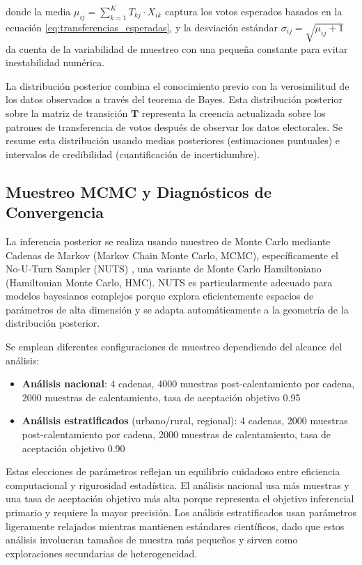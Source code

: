 donde la media $\mu_{ij} = \sum_{k=1}^{K} T_{kj} \cdot X_{ik}$ captura los votos esperados basados en la ecuación \ref{eq:transferencias_esperadas}, y la desviación estándar $\sigma_{ij} = \sqrt{\mu_{ij} + 1}$ da cuenta de la variabilidad de muestreo con una pequeña constante para evitar inestabilidad numérica.

La distribución posterior combina el conocimiento previo con la verosimilitud de los datos observados a través del teorema de Bayes. Esta distribución posterior sobre la matriz de transición $\mathbf{T}$ representa la creencia actualizada sobre los patrones de transferencia de votos después de observar los datos electorales. Se resume esta distribución usando medias posteriores (estimaciones puntuales) e intervalos de credibilidad (cuantificación de incertidumbre).

\subsection{Muestreo MCMC y Diagnósticos de Convergencia}

La inferencia posterior se realiza usando muestreo de Monte Carlo mediante Cadenas de Markov (Markov Chain Monte Carlo, MCMC), específicamente el No-U-Turn Sampler (NUTS) \cite{betancourt2017conceptual}, una variante de Monte Carlo Hamiltoniano (Hamiltonian Monte Carlo, HMC). NUTS es particularmente adecuado para modelos bayesianos complejos porque explora eficientemente espacios de parámetros de alta dimensión y se adapta automáticamente a la geometría de la distribución posterior.

Se emplean diferentes configuraciones de muestreo dependiendo del alcance del análisis:

\begin{itemize}
    \item \textbf{Análisis nacional}: 4 cadenas, 4000 muestras post-calentamiento por cadena, 2000 muestras de calentamiento, tasa de aceptación objetivo 0.95
    \item \textbf{Análisis estratificados} (urbano/rural, regional): 4 cadenas, 2000 muestras post-calentamiento por cadena, 2000 muestras de calentamiento, tasa de aceptación objetivo 0.90
\end{itemize}

Estas elecciones de parámetros reflejan un equilibrio cuidadoso entre eficiencia computacional y rigurosidad estadística. El análisis nacional usa más muestras y una tasa de aceptación objetivo más alta porque representa el objetivo inferencial primario y requiere la mayor precisión. Los análisis estratificados usan parámetros ligeramente relajados mientras mantienen estándares científicos, dado que estos análisis involucran tamaños de muestra más pequeños y sirven como exploraciones secundarias de heterogeneidad.

